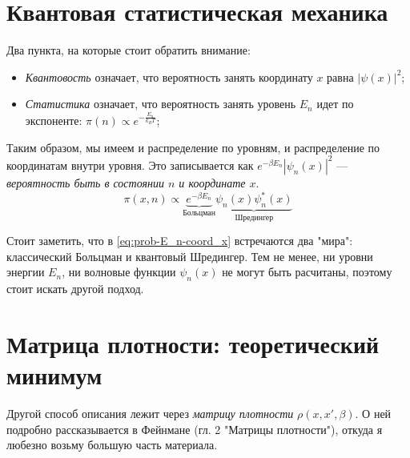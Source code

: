\begin{lecture}
\section{Квантовая статистическая механика}
Два пункта, на которые стоит обратить внимание:
\begin{itemize}
    \item \textit{Квантовость} означает, что вероятность занять координату $x$ равна $|\psi (x)|^2$;
    \item \textit{Статистика} означает, что вероятность занять уровень $E_n$ идет по экспоненте: $\pi (n) \propto e^{-\frac{E_n}{k_B T}} $; 
\end{itemize}

Таким образом, мы имеем и распределение по уровням, и распределение по координатам внутри уровня.
Это записывается как $e^{-\beta E_n} |\psi_n (x)|^2$ --- \textit{вероятность быть в состоянии $n$ и координате $x$}.
\begin{equation}
    \label{eq:prob-E_n-coord_x}
    \pi (x, n) \propto \underbrace{e^{-\beta E_n}}_\text{Больцман} \underbrace{\psi_n (x) \psi_n^* (x)}_\text{Шредингер}
\end{equation}

Стоит заметить, что в \eqref{eq:prob-E_n-coord_x} встречаются два "мира": классический Больцман и квантовый Шредингер.
Тем не менее, ни уровни энергии $E_n$, ни волновые функции $\psi_n (x)$ не могут быть расчитаны, поэтому стоит искать другой подход.

\section{Матрица плотности: теоретический минимум}
Другой способ описания лежит через \textit{матрицу плотности} $\rho (x, x\prime, \beta)$.
О ней подробно рассказывается в Фейнмане \cite{feynman} (гл. 2 "Матрицы плотности"), откуда я любезно возьму большую часть материала.


\end{lecture}
